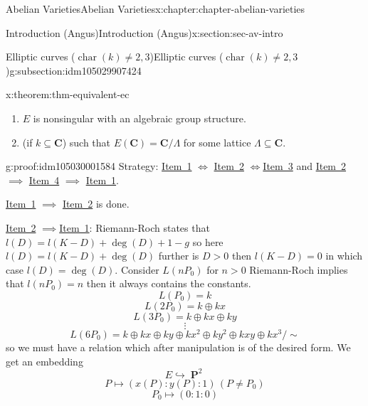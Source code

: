 \documentclass[oneside,10pt,]{book}
\numberwithin{equation}{section}
\newcommand{\CC}{\mathbf{C}}
\DeclareMathOperator{\characteristic}{char}
\DeclareMathOperator{\PP}{\mathbf{P}}
\newcommand{\gt}{>}
\begin{document}
\begin{chapterptx}{Abelian Varieties}{}{Abelian Varieties}{}{}{x:chapter:chapter-abelian-varieties}
\begin{sectionptx}{Introduction (Angus)}{}{Introduction (Angus)}{}{}{x:section:sec-av-intro}
\begin{subsectionptx}{Elliptic curves (\(\characteristic(k) \ne 2,3\))}{}{Elliptic curves (\(\characteristic(k) \ne 2,3\))}{}{}{g:subsection:idm105029907424}
\begin{theorem}{}{}{x:theorem:thm-equivalent-ec}
\begin{enumerate}
\item\hypertarget{x:li:item-nonsing-gp}{}\(E\) is nonsingular with an algebraic group structure.%
\item\hypertarget{x:li:item-cmplx}{}(if \(k \subseteq \CC\)) such that \(E(\CC) = \CC/\Lambda\) for some lattice \(\Lambda \subseteq \CC\).%
\end{enumerate}
%
\end{theorem}
\begin{proofptx}{}{g:proof:idm105030001584}
Strategy: \hyperlink{x:li:item-cubic-eq}{Item~1} \(\iff\) \hyperlink{x:li:item-nonsing-pt}{Item~2} \(\iff\)\hyperlink{x:li:item-nonsing-gp}{Item~3} and \hyperlink{x:li:item-nonsing-pt}{Item~2} \(\implies\) \hyperlink{x:li:item-cmplx}{Item~4} \(\implies\) \hyperlink{x:li:item-cubic-eq}{Item~1}.%
\par
\hyperlink{x:li:item-cubic-eq}{Item~1} \(\implies\) \hyperlink{x:li:item-nonsing-pt}{Item~2} is done.%
\par
\hyperlink{x:li:item-nonsing-pt}{Item~2} \(\implies\)\hyperlink{x:li:item-cubic-eq}{Item~1}: Riemann-Roch states that \(l(D) = l(K-D) +  \deg(D) + 1 -g \) so here \(l(D) = l(K-D) + \deg (D)\) further is \(D\gt 0\) then \(l(K-D) = 0\) in which case \(l(D) = \deg(D)\). Consider \(L(nP_0)\) for \(n \gt 0\) Riemann-Roch implies that \(l(nP_0) = n\) then it always contains the constants.%
\begin{equation*}
L(P_0) = k
\end{equation*}
%
\begin{equation*}
L(2P_0) = k \oplus kx
\end{equation*}
%
\begin{equation*}
L(3P_0) = k \oplus kx \oplus ky
\end{equation*}
%
\begin{equation*}
\vdots
\end{equation*}
%
\begin{equation*}
L(6P_0) = k \oplus kx \oplus ky \oplus k x^2 \oplus ky^2 \oplus kxy \oplus kx^3/\sim
\end{equation*}
so we must have a relation which after manipulation is of the desired form. We get an embedding%
\begin{equation*}
E \hookrightarrow \PP^2
\end{equation*}
%
\begin{equation*}
P\mapsto (x(P):y(P): 1) \,(P\ne P_0)
\end{equation*}
%
\begin{equation*}
P_0 \mapsto (0:1 : 0)
\end{equation*}

\end{proofptx}
\end{subsectionptx}
\end{sectionptx}
\end{chapterptx}
\end{document}
